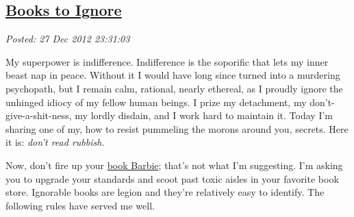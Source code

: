 %

\subsection*{\href{http://bakerjd99.wordpress.com/2012/12/27/books-to-ignore/}{Books to Ignore}}


\noindent\emph{Posted: 27 Dec 2012 23:31:03}
\vspace{6pt}

My superpower is indifference. Indifference is the soporific that lets
my inner beast nap in peace. Without it I would have long since turned
into a murdering psychopath, but I remain calm, rational, nearly
ethereal, as I proudly ignore the unhinged idiocy of my fellow human
beings. I prize my detachment, my don't-give-a-shit-ness, my lordly
disdain, and I work hard to maintain it. Today I'm sharing one of my,
how to resist pummeling the morons around you, secrets. Here it is:
\emph{don't read rubbish.}

Now, don't fire up your
\href{https://www.youtube.com/watch?v=ETJP1ElHTps}{book Barbie}; that's
not what I'm suggesting. I'm asking you to upgrade your standards and
scoot past toxic aisles in your favorite book store. Ignorable books are
legion and they're relatively easy to identify. The following rules have
served me well.

